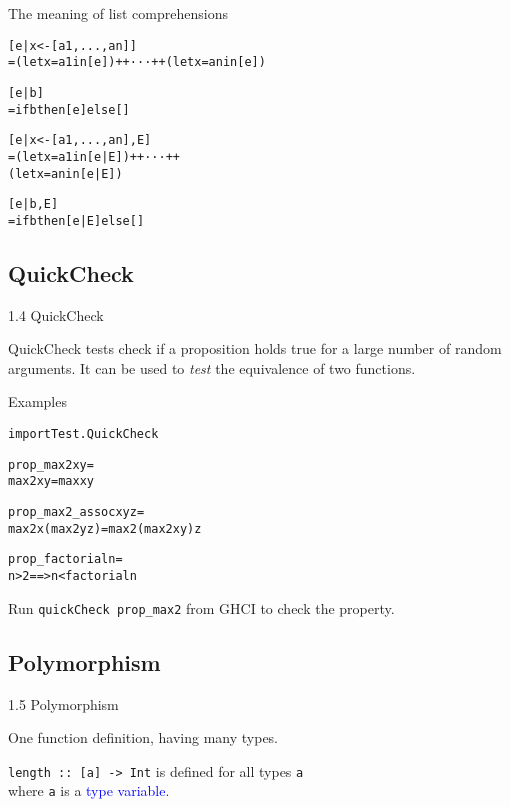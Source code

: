 \documentclass{beamer}
\def\code#1{\texttt{\frenchspacing#1}}
\begin{document}
\begin{frame}[fragile]{The meaning of list comprehensions}

\begin{alltt}
[e | x <- [a1,...,an]]\pause
= (let x = a1 in [e]) ++ · · · ++ (let x = an in [e])

[e | b]\pause
= if b then [e] else []

[e | x <- [a1,...,an], E]\pause
= (let x = a1 in [e | E]) ++ · · · ++
  (let x = an in [e | E])

[e | b, E]\pause
= if b then [e | E] else []
\end{alltt}

\end{frame}

\subsection{QuickCheck}

\begin{frame}[fragile]{1.4 QuickCheck}

QuickCheck tests check if a proposition holds true for a large number of random arguments.
It can be used to \textit{test} the equivalence of two functions.

\pause

\begin{exampleblock}{Examples}
\begin{alltt}
import Test.QuickCheck

prop_max2 x y =
  max2 x y = max x y\pause

prop_max2_assoc x y z =
  max2 x (max2 y z) = max2 (max2 x y) z\pause

prop_factorial n =
  n > 2 ==> n < factorial n
\end{alltt}
\end{exampleblock}

\pause

Run \code{quickCheck prop\_max2} from GHCI to check the property.

\end{frame}

\subsection{Polymorphism}

\begin{frame}[fragile]{1.5 Polymorphism}

\begin{block}{\centering One function definition, having many types.}
\end{block}

\pause

\vspace{1cm}
\code{length :: [a] -> Int} is defined for all types \code{a} \\
where \code{a} is a \textcolor{blue}{type variable}.

\end{frame}
\end{document}
